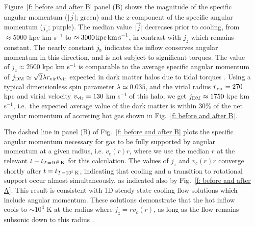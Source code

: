 \documentclass[fleqn,usenatbib]{mnras}
\newcommand{\tcon}{t_{T=10^5\,{\rm K}}}
\newcommand{\Rvir}{r_{\rm vir}}
\newcommand{\vvir}{v_{\rm vir}}
\begin{document}
Figure~\ref{f: before and after B} panel (B) shows the magnitude of the specific angular momentum ($\vert \vec j \vert$; green) and the z-component of the specific angular momentum ($j_z$; purple).
The median value $\vert \vec j \vert$ decreases prior to cooling, from $\approx 5000$ kpc km s$^{-1}$ to $\approx 3000\,{\rm kpc\,km\,s}^{-1}$, in contrast with  $j_z$ which remains constant.
The nearly constant $j_{\rm z}$ indicates the inflow conserves angular momentum in this direction, and is not subject to significant torques. 
The value of $j_z\approx 2500$ kpc km s$^{-1}$ is comparable to the average specific angular momentum of $j_{\rm DM} \simeq \sqrt{2}\lambda \Rvir \vvir$ expected in dark matter halos due to tidal torques \citep[e.g.][]{Bullock2001}.
Using a typical dimensionless spin parameter $\lambda \simeq 0.035$, and the virial radius $\Rvir=270$ kpc and virial velocity $\vvir=130$ km s$^{-1}$ of this halo, we get $j_{\rm DM}\approx1750$ kpc km s$^{-1}$, i.e.~the expected average value of the dark matter is within $30\%$ of the net angular momentum of accreting hot gas shown in Fig.~\ref{f: before and after B}. 

The dashed line in panel (B) of Fig.~\ref{f: before and after B} plots the specific angular momentum necessary for gas to be fully supported by angular momentum at a given radius, i.e. $v_c(r)r$, where we use the median $r$ at the relevant $t-\tcon$ for this calculation. 
The values of $j_z$ and $v_c(r)r$ converge shortly after $t=\tcon$, indicating that cooling and a transition to rotational support occur almost simultaneously, as indicated also by Fig.~\ref{f: before and after A}.
This result is consistent with 1D steady-state cooling flow solutions which include angular momentum.
These solutions demonstrate that the hot inflow cools to $\sim10^4$ K at the radius where $j_z=r v_c(r)$, as long as the flow remains subsonic down to this radius \citep{Cowie1980, Stern2019}.

\end{document}
